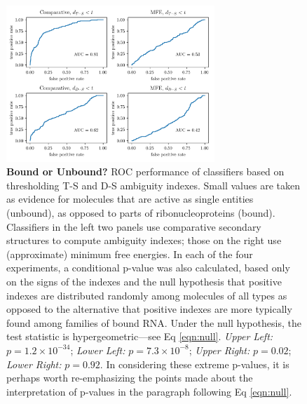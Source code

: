 \begin{figure}[h!]
\centering
\includegraphics[width=0.7\textwidth]{bound_unbound.png}
\vglue 0.5cm

\caption{{\bf Bound or Unbound?} ROC performance of classifiers based on thresholding T-S
and D-S ambiguity indexes. Small values are taken as evidence for molecules that are active as
single entities (unbound), as opposed to parts of ribonucleoproteins (bound). Classifiers in the
left two panels use comparative secondary structures to compute ambiguity indexes; those on the
right use (approximate) minimum free energies. In each of the four experiments, a conditional
p-value was also calculated, based only on the signs of the indexes and the null hypothesis that
positive indexes are distributed randomly among molecules of all types as opposed to the alternative
that positive indexes are more typically found among families of bound RNA. Under the null hypothesis,
the test statistic is hypergeometric---see Eq \ref{eqn:null}. {\em Upper Left:} $p= 1.2 \times 10^{-34} $; {\em Lower Left:} $p=7.3 \times 10^{-8}$; {\em Upper Right:} $p=0.02$;  {\em Lower Right:} $p=0.92$. In considering these extreme p-values, it is perhaps worth re-emphasizing the points made about the interpretation of p-values in the paragraph following Eq \ref{eqn:null}.}  
\label{fig:UnboundVSBound}
\end{figure}

